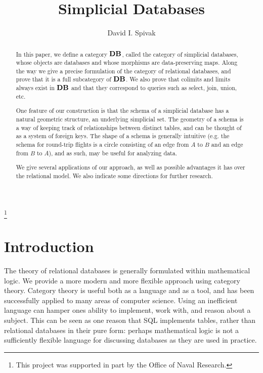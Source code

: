 \documentclass{amsart}
\def\Data{{\bf DB}}
\begin{document}
\author{David I. Spivak}

\thanks{This project was supported in part by the Office of Naval Research.}

\title{Simplicial Databases}

\begin{abstract}

In this paper, we define a category $\Data$, called the category of simplicial databases, whose objects are databases and whose morphisms are data-preserving maps.  Along the way we give a precise formulation of the category of relational databases, and prove that it is a full subcategory of $\Data$.  We also prove that colimits and limits always exist in $\Data$ and that they correspond to queries such as select, join, union, etc.

One feature of our construction is that the schema of a simplicial database has a natural geometric structure, an underlying simplicial set.  The geometry of a schema is a way of keeping track of relationships between distinct tables, and can be thought of as a system of foreign keys.  The shape of a schema is generally intuitive (e.g. the schema for round-trip flights is a circle consisting of an edge from $A$ to $B$ and an edge from $B$ to $A$), and as such, may be useful for analyzing data.  

We give several applications of our approach, as well as possible advantages it has over the relational model.  We also indicate some directions for further research.

\end{abstract}

\maketitle

\setcounter{tocdepth}{1}

\tableofcontents


\section{Introduction}\label{sec:intro}


The theory of relational databases is generally formulated within mathematical logic.  We provide a more modern and more flexible approach using category theory.  Category theory is useful both as a language and as a tool, and has been successfully applied to many areas of computer science.  Using an inefficient language can hamper ones ability to implement, work with, and reason about a subject.  This can be seen as one reason that SQL implements tables, rather than relational databases in their pure form: perhaps mathematical logic is not a sufficiently flexible language for discussing databases as they are used in practice.
\end{document}
